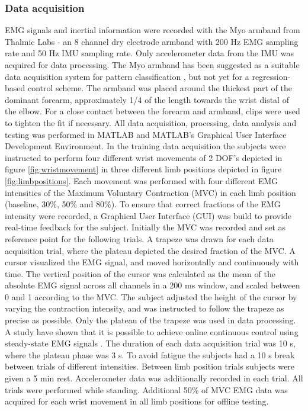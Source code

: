 \begin{multicols}{2}
\subsubsection*{Data acquisition}
EMG signals and inertial information were recorded with the Myo armband from Thalmic Labs - an 8 channel dry electrode armband with 200 Hz EMG sampling rate and 50 Hz IMU sampling rate. Only accelerometer data from the IMU was acquired for data processing. The Myo armband has been suggested as a suitable data acquisition system for pattern classification \cite{Mendez2017}, but not yet for a regression-based control scheme. 
The armband was placed around the thickest part of the dominant forearm, approximately 1/4 of the length towards the wrist distal of the elbow. For a close contact between the forearm and armband, clips were used to tighten the fit if necessary. All data acquisition, processing, data analysis and testing was performed in MATLAB and MATLAB's Graphical User Interface Development Environment.
In the training data acquisition the subjects were instructed to perform four different wrist movements of 2 DOF's depicted in figure \ref{fig:wristmovement} in three different limb positions depicted in figure \ref{fig:limbpositions}. Each movement was performed with four different EMG intensities of the Maximum Voluntary Contraction (MVC) in each limb position (baseline, 30\%, 50\% and 80\%). To ensure that correct fractions of the EMG intensity were recorded, a Graphical User Interface (GUI) was build to provide real-time feedback for the subject. Initially the MVC was recorded and set as reference point for the following trials. A trapeze was drawn for each data acquisition trial, where the plateau depicted the desired fraction of the MVC. A cursor visualized the EMG signal, and moved horizontally and continuously with time. The vertical position of the cursor was calculated as the mean of the absolute EMG signal across all channels in a 200 ms window, and scaled between 0 and 1 according to the MVC. The subject adjusted the height of the cursor by varying the contraction intensity, and was instructed to follow the trapeze as precise as possible. Only the plateau of the trapeze was used in data processing. A study have shown that it is possible to achieve online continuous control using steady-state EMG signals \cite{mobarak2014}. The duration of each data acquisition trial was 10 s, where the plateau phase was 3 s. To avoid fatigue the subjects had a 10 s break between trials of different intensities. Between limb position trials subjects were given a 5 min rest. Accelerometer data was additionally recorded in each trial. All trials were performed while standing.
Additional 50\% of MVC EMG data was acquired for each wrist movement in all limb positions for offline testing.


\end{multicols}
